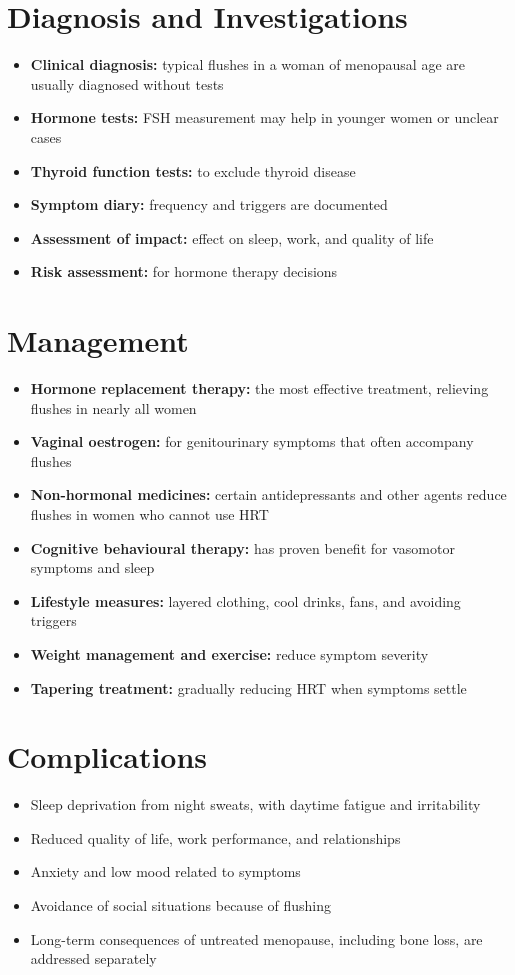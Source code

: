\section*{Diagnosis and Investigations}
\begin{itemize}
    \item \textbf{Clinical diagnosis:} typical flushes in a woman of menopausal age are usually diagnosed without tests
    \item \textbf{Hormone tests:} FSH measurement may help in younger women or unclear cases
    \item \textbf{Thyroid function tests:} to exclude thyroid disease
    \item \textbf{Symptom diary:} frequency and triggers are documented
    \item \textbf{Assessment of impact:} effect on sleep, work, and quality of life
    \item \textbf{Risk assessment:} for hormone therapy decisions
\end{itemize}

\section*{Management}
\begin{itemize}
    \item \textbf{Hormone replacement therapy:} the most effective treatment, relieving flushes in nearly all women
    \item \textbf{Vaginal oestrogen:} for genitourinary symptoms that often accompany flushes
    \item \textbf{Non-hormonal medicines:} certain antidepressants and other agents reduce flushes in women who cannot use HRT
    \item \textbf{Cognitive behavioural therapy:} has proven benefit for vasomotor symptoms and sleep
    \item \textbf{Lifestyle measures:} layered clothing, cool drinks, fans, and avoiding triggers
    \item \textbf{Weight management and exercise:} reduce symptom severity
    \item \textbf{Tapering treatment:} gradually reducing HRT when symptoms settle
\end{itemize}

\section*{Complications}
\begin{itemize}
    \item Sleep deprivation from night sweats, with daytime fatigue and irritability
    \item Reduced quality of life, work performance, and relationships
    \item Anxiety and low mood related to symptoms
    \item Avoidance of social situations because of flushing
    \item Long-term consequences of untreated menopause, including bone loss, are addressed separately
\end{itemize}

